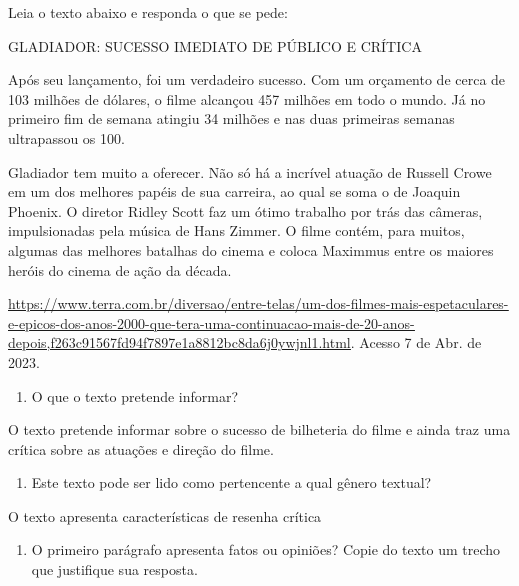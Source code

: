 {Leia o texto abaixo e responda o que se pede:

GLADIADOR: SUCESSO IMEDIATO DE PÚBLICO E CRÍTICA

Após seu lançamento, foi um verdadeiro sucesso. Com um orçamento de
cerca de 103 milhões de dólares, o filme alcançou 457 milhões em todo o
mundo. Já no primeiro fim de semana atingiu 34 milhões e nas duas
primeiras semanas ultrapassou os 100.

Gladiador tem muito a oferecer. Não só há a incrível atuação de Russell
Crowe em um dos melhores papéis de sua carreira, ao qual se soma o de
Joaquin Phoenix. O diretor Ridley Scott faz um ótimo trabalho por trás
das câmeras, impulsionadas pela música de Hans Zimmer. O filme contém,
para muitos, algumas das melhores batalhas do cinema e coloca Maximmus
entre os maiores heróis do cinema de ação da década.

\href{https://www.terra.com.br/diversao/entre-telas/um-dos-filmes-mais-espetaculares-e-epicos-dos-anos-2000-que-tera-uma-continuacao-mais-de-20-anos-depois,f263c91567fd94f7897e1a8812bc8da6j0ywjnl1.html}{\uline{https://www.terra.com.br/diversao/entre-telas/um-dos-filmes-mais-espetaculares-e-epicos-dos-anos-2000-que-tera-uma-continuacao-mais-de-20-anos-depois,f263c91567fd94f7897e1a8812bc8da6j0ywjnl1.html}}.
Acesso 7 de Abr. de 2023.

\begin{enumerate}
\def\labelenumi{\arabic{enumi})}
\setcounter{enumi}{2}
\tightlist
\item
  O que o texto pretende informar?
\end{enumerate}

O texto pretende informar sobre o sucesso de bilheteria do filme e ainda
traz uma crítica sobre as atuações e direção do filme.

\begin{enumerate}
\def\labelenumi{\arabic{enumi})}
\setcounter{enumi}{3}
\tightlist
\item
  Este texto pode ser lido como pertencente a qual gênero textual?
\end{enumerate}

O texto apresenta características de resenha crítica

\begin{enumerate}
\def\labelenumi{\arabic{enumi})}
\setcounter{enumi}{4}
\tightlist
\item
  O primeiro parágrafo apresenta fatos ou opiniões? Copie do texto um
  trecho que justifique sua resposta.
\end{enumerate}

}
